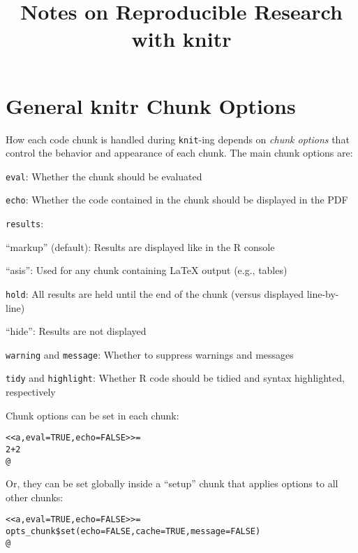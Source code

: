 \documentclass[11pt, a4paper]{article}
\title{Notes on Reproducible Research with knitr}
\date{}
\begin{document}
\maketitle
\onehalfspacing

\section*{General knitr Chunk Options}

How each code chunk is handled during \texttt{knit}-ing depends on \textit{chunk options} that control the behavior and appearance of each chunk. The main chunk options are:

\begin{itemize*}
    \item \texttt{eval}: Whether the chunk should be evaluated
    \item \texttt{echo}: Whether the code contained in the chunk should be displayed in the PDF
    \item \texttt{results}: 
        \begin{itemize*}
            \item ``markup'' (default): Results are displayed like in the R console
            \item ``asis'': Used for any chunk containing LaTeX output (e.g., tables)
            \item \texttt{hold}: All results are held until the end of the chunk (versus displayed line-by-line)
            \item ``hide'': Results are not displayed
        \end{itemize*}
    \item \texttt{warning} and \texttt{message}: Whether to suppress warnings and messages
    \item \texttt{tidy} and \texttt{highlight}: Whether R code should be tidied and syntax highlighted, respectively
\end{itemize*}

\noindent Chunk options can be set in each chunk:

\begin{alltt}
<<a, eval = TRUE, echo = FALSE>>=
2 + 2
@
\end{alltt}

\vspace{1em}
\noindent Or, they can be set globally inside a ``setup'' chunk that applies options to all other chunks:
\begin{alltt}
<<a, eval = TRUE, echo = FALSE>>=
opts\_chunk\$set(echo = FALSE, cache = TRUE, message = FALSE)
@
\end{alltt}
\end{document}
